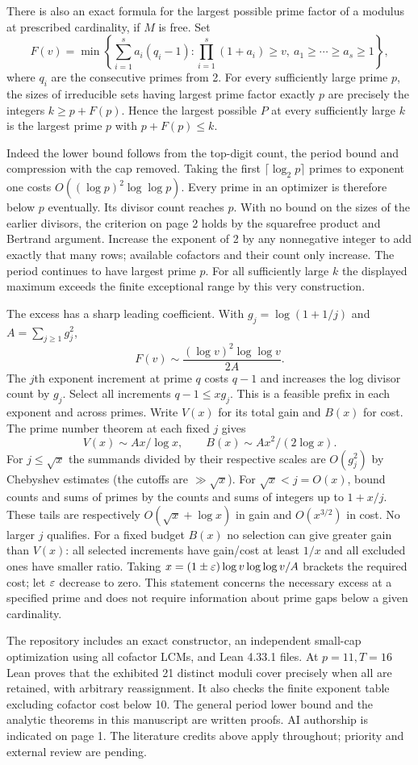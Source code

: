 \newpage
{}
There is also an exact formula for the largest possible prime factor of a modulus at prescribed cardinality, if $M$ is free. Set
\[
 F(v)=\min\left\{\sum_{i=1}^s a_i(q_i-1):
 \prod_{i=1}^s(1+a_i)\ge v,\ a_1\ge\cdots\ge a_s\ge1\right\},
\]
where $q_i$ are the consecutive primes from 2. For every sufficiently large prime $p$, the sizes of irreducible sets having largest prime factor exactly $p$ are precisely the integers $k\ge p+F(p)$. Hence the largest possible $P$ at every sufficiently large $k$ is the largest prime $p$ with $p+F(p)\le k$.

Indeed the lower bound follows from the top-digit count, the period bound and compression with the cap removed. Taking the first $\lceil\log_2 p\rceil$ primes to exponent one costs $O((\log p)^2\log\log p)$. Every prime in an optimizer is therefore below $p$ eventually. Its divisor count reaches $p$. With no bound on the sizes of the earlier divisors, the criterion on page 2 holds by the squarefree product and Bertrand argument. Increase the exponent of 2 by any nonnegative integer to add exactly that many rows; available cofactors and their count only increase. The period continues to have largest prime $p$. For all sufficiently large $k$ the displayed maximum exceeds the finite exceptional range by this very construction.

The excess has a sharp leading coefficient. With $g_j=\log(1+1/j)$ and $A=\sum_{j\ge1}g_j^2$,
\[
                  F(v)\sim\frac{(\log v)^2\log\log v}{2A}.
\]
The $j$th exponent increment at prime $q$ costs $q-1$ and increases the log divisor count by $g_j$. Select all increments $q-1\le xg_j$. This is a feasible prefix in each exponent and across primes. Write $V(x)$ for its total gain and $B(x)$ for cost. The prime number theorem at each fixed $j$ gives
\[
 V(x)\sim A x/\log x,\qquad B(x)\sim A x^2/(2\log x).
\]
For $j\le\sqrt x$ the summands divided by their respective scales are $O(g_j^2)$ by Chebyshev estimates (the cutoffs are $\gg\sqrt x$). For $\sqrt x<j=O(x)$, bound counts and sums of primes by the counts and sums of integers up to $1+x/j$. These tails are respectively $O(\sqrt x+\log x)$ in gain and $O(x^{3/2})$ in cost. No larger $j$ qualifies. For a fixed budget $B(x)$ no selection can give greater gain than $V(x)$: all selected increments have gain/cost at least $1/x$ and all excluded ones have smaller ratio. Taking $x=(1\pm\varepsilon)\log v\log\log v/A$ brackets the required cost; let $\varepsilon$ decrease to zero. This statement concerns the necessary excess at a specified prime and does not require information about prime gaps below a given cardinality.

The repository includes an exact constructor, an independent small-cap optimization using all cofactor LCMs, and Lean 4.33.1 files. At $p=11,T=16$ Lean proves that the exhibited 21 distinct moduli cover precisely when all are retained, with arbitrary reassignment. It also checks the finite exponent table excluding cofactor cost below 10. The general period lower bound and the analytic theorems in this manuscript are written proofs. AI authorship is indicated on page 1. The literature credits above apply throughout; priority and external review are pending.
